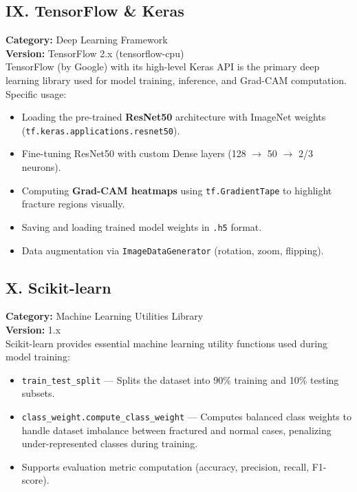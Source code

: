 \documentclass[a4paper,12pt]{report}
\begin{document}
    \subsection*{IX. TensorFlow \& Keras}
    \textbf{Category:} Deep Learning Framework\\
    \textbf{Version:} TensorFlow 2.x (tensorflow-cpu)\\
    TensorFlow (by Google) with its high-level Keras API is the primary deep learning library used for model training, inference, and Grad-CAM computation. Specific usage:
    \begin{itemize}
        \item Loading the pre-trained \textbf{ResNet50} architecture with ImageNet weights (\texttt{tf.keras.applications.resnet50}).
        \item Fine-tuning ResNet50 with custom Dense layers (128 $\to$ 50 $\to$ 2/3 neurons).
        \item Computing \textbf{Grad-CAM heatmaps} using \texttt{tf.GradientTape} to highlight fracture regions visually.
        \item Saving and loading trained model weights in \texttt{.h5} format.
        \item Data augmentation via \texttt{ImageDataGenerator} (rotation, zoom, flipping).
    \end{itemize}

    \subsection*{X. Scikit-learn}
    \textbf{Category:} Machine Learning Utilities Library\\
    \textbf{Version:} 1.x\\
    Scikit-learn provides essential machine learning utility functions used during model training:
    \begin{itemize}
        \item \texttt{train\_test\_split} — Splits the dataset into 90\% training and 10\% testing subsets.
        \item \texttt{class\_weight.compute\_class\_weight} — Computes balanced class weights to handle dataset imbalance between fractured and normal cases, penalizing under-represented classes during training.
        \item Supports evaluation metric computation (accuracy, precision, recall, F1-score).
    \end{itemize}
\end{document}
